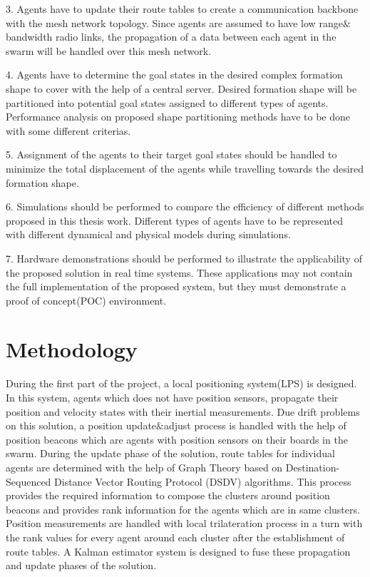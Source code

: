 3. Agents have to update their route tables to create a communication backbone with the mesh network topology. Since agents are assumed to have low range$\&$bandwidth radio links, the propagation of a data between each agent in the swarm will be handled over this mesh network. 

4. Agents have to determine the goal states in the desired complex formation shape to cover with the help of a central server. Desired formation shape will be partitioned into potential goal states assigned to different types of agents. Performance analysis on proposed shape partitioning methods have to be done with some different criterias. 

5. Assignment of the agents to their target goal states should be handled to minimize the total displacement of the agents while travelling towards the desired formation shape. 

6. Simulations should be performed to compare the efficiency of different methods proposed in this thesis work. Different types of agents have to be represented with different dynamical and physical models during simulations.

7. Hardware demonstrations should be performed to illustrate the applicability of the proposed solution in real time systems. These applications may not contain the full implementation of the proposed system, but they must demonstrate a proof of concept(POC) environment.

\section{Methodology}
During the first part of the project, a local positioning system(LPS) is designed. In this system, agents which does not have position sensors, propagate their position and velocity states with their inertial measurements. Due drift problems on this solution, a position update$\&$adjust process is handled with the help of position beacons which are agents with position sensors on their boards in the swarm. During the update phase of the solution, route tables for individual agents are determined with the help of Graph Theory based on Destination-Sequenced Distance Vector Routing Protocol (DSDV) algorithms. This process provides the required information to compose the clusters around position beacons and provides rank information for the agents which are in same clusters. Position measurements are handled with local trilateration process in a turn with the rank values for every agent around each cluster after the establishment of route tables. A Kalman estimator system is designed to fuse these propagation and update phases of the solution.

